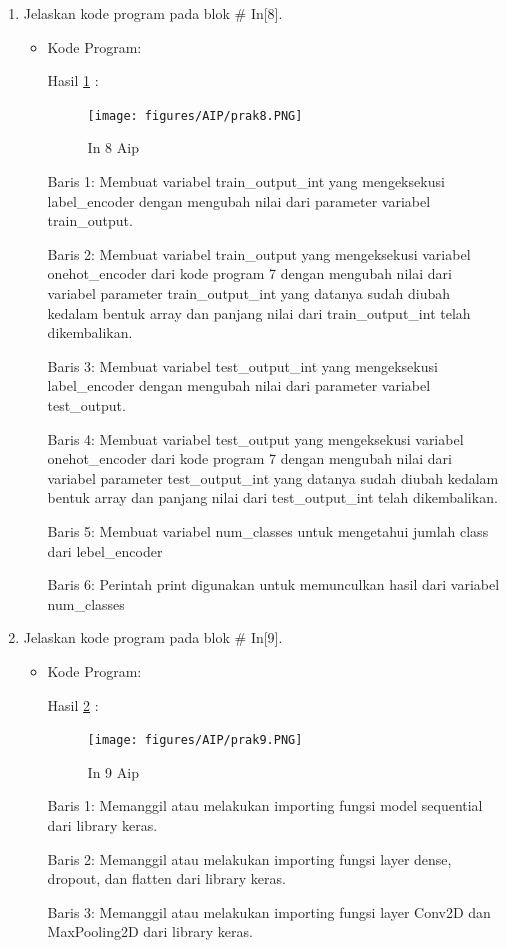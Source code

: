 \begin{enumerate}
\item Jelaskan kode program pada blok \# In[8].
\begin{itemize}
\item Kode Program:

\par Hasil \ref{in8aip} :
\begin{figure}[!hbtp]
\centering
\texttt{[image: figures/AIP/prak8.PNG]}
\caption{In 8 Aip}
\label{in8aip}
\end{figure}
\par Baris 1: Membuat variabel train\_output\_int yang mengeksekusi label\_encoder dengan mengubah nilai dari parameter variabel train\_output.
\par Baris 2: Membuat variabel train\_output yang mengeksekusi variabel onehot\_encoder dari kode program 7 dengan mengubah nilai dari variabel parameter train\_output\_int yang datanya sudah diubah kedalam bentuk array dan panjang nilai dari train\_output\_int telah dikembalikan.
\par Baris 3: Membuat variabel test\_output\_int yang mengeksekusi label\_encoder dengan mengubah nilai dari parameter variabel test\_output.
\par Baris 4: Membuat variabel test\_output yang mengeksekusi variabel onehot\_encoder dari kode program 7 dengan mengubah nilai dari variabel parameter test\_output\_int yang datanya sudah diubah kedalam bentuk array dan panjang nilai dari test\_output\_int telah dikembalikan.
\par Baris 5: Membuat variabel num\_classes untuk mengetahui jumlah class dari lebel\_encoder
\par Baris 6: Perintah print digunakan untuk memunculkan hasil dari variabel num\_classes
\end{itemize}
\par

\item Jelaskan kode program pada blok \# In[9].
\begin{itemize}
\item Kode Program:

\par Hasil \ref{in9aip} :
\begin{figure}[!hbtp]
\centering
\texttt{[image: figures/AIP/prak9.PNG]}
\caption{In 9 Aip}
\label{in9aip}
\end{figure}
\par Baris 1: Memanggil atau melakukan importing fungsi model sequential dari library keras.
\par Baris 2: Memanggil atau melakukan importing fungsi layer dense, dropout, dan flatten dari library keras.
\par Baris 3: Memanggil atau melakukan importing fungsi layer Conv2D dan MaxPooling2D dari library keras.
\end{itemize}
\par


\end{enumerate}
